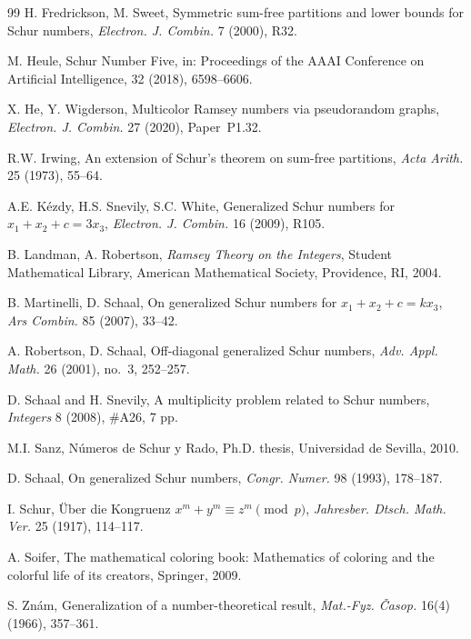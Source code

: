 \documentclass[twoside, 12pt]{article}
\begin{document}
\begin{thebibliography}{99}
H. Fredrickson, M. Sweet, Symmetric sum-free partitions and lower bounds for Schur numbers, \emph{Electron. J. Combin.} 7 (2000), R32.


M. Heule, Schur Number Five, in: Proceedings of the AAAI Conference on Artificial Intelligence, 32 (2018), 6598--6606.


X. He, Y. Wigderson,
Multicolor Ramsey numbers via pseudorandom graphs,
\emph{Electron. J. Combin.} 27 (2020), Paper~P1.32.


R.W. Irwing, An extension of Schur’s theorem on sum-free partitions, \emph{Acta Arith.} 25 (1973), 55--64.

A.E. K\'{e}zdy, H.S. Snevily, S.C. White, Generalized Schur numbers for $x_1+x_2+c=3x_3$, \emph{Electron. J. Combin.} 16 (2009), R105.


B. Landman, A. Robertson, \emph{Ramsey Theory on the Integers}, Student Mathematical Library, American Mathematical Society, Providence, RI, 2004.


B. Martinelli, D. Schaal, On generalized Schur numbers for $x_1+x_2+c=k x_3$, \emph{Ars Combin.} 85 (2007), 33--42.



A. Robertson, D. Schaal, Off-diagonal generalized Schur numbers, \emph{Adv. Appl. Math.} 26 (2001), no.~3, 252--257.


D. Schaal and H. Snevily, A multiplicity problem related to Schur numbers, \emph{Integers} 8 (2008), \#A26, 7 pp.

M.I. Sanz, N\'{u}meros de Schur y Rado, Ph.D. thesis, Universidad de Sevilla, 2010.

D. Schaal, On generalized Schur numbers, \emph{Congr. Numer.} 98 (1993), 178--187.



I. Schur, \"{U}ber die Kongruenz $x^m+y^m\equiv z^m \pmod p$, \emph{Jahresber. Dtsch. Math. Ver.} 25 (1917), 114--117.

A. Soifer, The mathematical coloring book: Mathematics of coloring and the colorful life of its creators, Springer, 2009.



S. Zn\'{a}m, Generalization of a number-theoretical result, \emph{Mat.-Fyz. \v{C}asop. } 16(4) (1966), 357--361.




\end{thebibliography}
\end{document}
